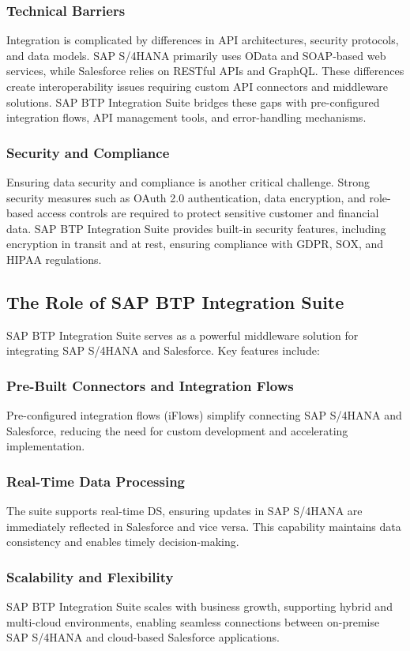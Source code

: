 \subsubsection{Technical Barriers}
Integration is complicated by differences in API architectures, security protocols, and data models. SAP S/4HANA primarily uses OData and SOAP-based web services, while Salesforce relies on RESTful APIs and GraphQL. These differences create interoperability issues requiring custom API connectors and middleware solutions. SAP BTP Integration Suite bridges these gaps with pre-configured integration flows, API management tools, and error-handling mechanisms.

\subsubsection{Security and Compliance}
Ensuring data security and compliance is another critical challenge. Strong security measures such as OAuth 2.0 authentication, data encryption, and role-based access controls are required to protect sensitive customer and financial data. SAP BTP Integration Suite provides built-in security features, including encryption in transit and at rest, ensuring compliance with GDPR, SOX, and HIPAA regulations.

\subsection{The Role of SAP BTP Integration Suite}
SAP BTP Integration Suite serves as a powerful middleware solution for integrating SAP S/4HANA and Salesforce. Key features include:

\subsubsection{Pre-Built Connectors and Integration Flows}
Pre-configured integration flows (iFlows) simplify connecting SAP S/4HANA and Salesforce, reducing the need for custom development and accelerating implementation.

\subsubsection{Real-Time Data Processing}
The suite supports real-time DS, ensuring updates in SAP S/4HANA are immediately reflected in Salesforce and vice versa. This capability maintains data consistency and enables timely decision-making.

\subsubsection{Scalability and Flexibility}
SAP BTP Integration Suite scales with business growth, supporting hybrid and multi-cloud environments, enabling seamless connections between on-premise SAP S/4HANA and cloud-based Salesforce applications.

